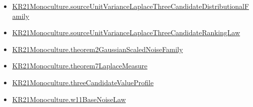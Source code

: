 \documentclass[10pt]{article}
\begin{document}
\begin{itemize}
\item \hyperlink{governing-declaration-9bb46e82550873e7}{KR21\allowbreak{}Monoculture.\allowbreak{}source\allowbreak{}Unit\allowbreak{}Variance\allowbreak{}Laplace\allowbreak{}Three\allowbreak{}Candidate\allowbreak{}Distributional\allowbreak{}Family}
\item \hyperlink{governing-declaration-56c8c8a34ec01fee}{KR21\allowbreak{}Monoculture.\allowbreak{}source\allowbreak{}Unit\allowbreak{}Variance\allowbreak{}Laplace\allowbreak{}Three\allowbreak{}Candidate\allowbreak{}Ranking\allowbreak{}Law}
\item \hyperlink{governing-declaration-9f21913ec687a0bf}{KR21\allowbreak{}Monoculture.\allowbreak{}theorem2\allowbreak{}Gaussian\allowbreak{}Scaled\allowbreak{}Noise\allowbreak{}Family}
\item \hyperlink{governing-declaration-97e4c5c78b47f45a}{KR21\allowbreak{}Monoculture.\allowbreak{}theorem7\allowbreak{}Laplace\allowbreak{}Measure}
\item \hyperlink{governing-declaration-bcbc7730fd1aad6d}{KR21\allowbreak{}Monoculture.\allowbreak{}three\allowbreak{}Candidate\allowbreak{}Value\allowbreak{}Profile}
\item \hyperlink{governing-declaration-8ad91ddc79a1a3cc}{KR21\allowbreak{}Monoculture.\allowbreak{}w11\allowbreak{}Base\allowbreak{}Noise\allowbreak{}Law}
\end{itemize}
\end{document}
